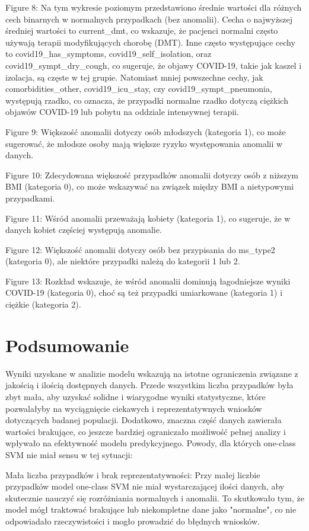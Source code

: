 \documentclass[a4paper,fleqn]{cas-dc}
\begin{document}
Figure 8: Na tym wykresie poziomym przedstawiono średnie wartości dla różnych cech binarnych w normalnych przypadkach (bez anomalii). Cecha o najwyższej średniej wartości to current\_dmt, co wskazuje, że pacjenci normalni często używają terapii modyfikujących chorobę (DMT). Inne często występujące cechy to covid19\_has\_symptoms, covid19\_self\_isolation, oraz covid19\_sympt\_dry\_cough, co sugeruje, że objawy COVID-19, takie jak kaszel i izolacja, są częste w tej grupie. Natomiast mniej powszechne cechy, jak comorbidities\_other, covid19\_icu\_stay, czy covid19\_sympt\_pneumonia, występują rzadko, co oznacza, że przypadki normalne rzadko dotyczą ciężkich objawów COVID-19 lub pobytu na oddziale intensywnej terapii.

Figure 9: Większość anomalii dotyczy osób młodszych (kategoria 1), co może sugerować, że młodsze osoby mają większe ryzyko występowania anomalii w danych.

Figure 10: Zdecydowana większość przypadków anomalii dotyczy osób z niższym BMI (kategoria 0), co może wskazywać na związek między BMI a nietypowymi przypadkami.

Figure 11: Wśród anomalii przeważają kobiety (kategoria 1), co sugeruje, że w danych kobiet częściej występują anomalie.

Figure 12: Większość anomalii dotyczy osób bez przypisania do ms\_type2 (kategoria 0), ale niektóre przypadki należą do kategorii 1 lub 2.

Figure 13: Rozkład wskazuje, że wśród anomalii dominują łagodniejsze wyniki COVID-19 (kategoria 0), choć są też przypadki umiarkowane (kategoria 1) i ciężkie (kategoria 2).

\section{Podsumowanie}
Wyniki uzyskane w analizie modelu wskazują na istotne ograniczenia związane z jakością i ilością dostępnych danych. Przede wszystkim liczba przypadków była zbyt mała, aby uzyskać solidne i wiarygodne wyniki statystyczne, które pozwalałyby na wyciągnięcie ciekawych i reprezentatywnych wniosków dotyczących badanej populacji. Dodatkowo, znaczna część danych zawierała wartości brakujące, co jeszcze bardziej ograniczało możliwość pełnej analizy i wpływało na efektywność modelu predykcyjnego.
Powody, dla których one-class SVM nie miał sensu w tej sytuacji:

Mała liczba przypadków i brak reprezentatywności: Przy małej liczbie przypadków model one-class SVM nie miał wystarczającej ilości danych, aby skutecznie nauczyć się rozróżniania normalnych i anomalii. To skutkowało tym, że model mógł traktować brakujące lub niekompletne dane jako "normalne", co nie odpowiadało rzeczywistości i mogło prowadzić do błędnych wniosków.
\end{document}

